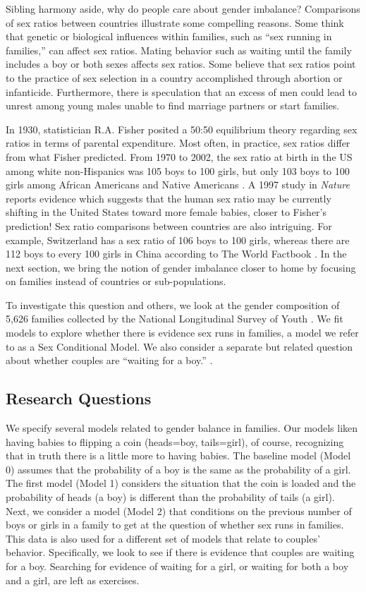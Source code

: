 \documentclass[
]{krantz}
\begin{document}
Sibling harmony aside, why do people care about gender imbalance? Comparisons of sex ratios between countries illustrate some compelling reasons. Some think that genetic or biological influences within families, such as ``sex running in families,'' can affect sex ratios. Mating behavior such as waiting until the family includes a boy or both sexes affects sex ratios. Some believe that sex ratios point to the practice of sex selection in a country accomplished through abortion or infanticide. Furthermore, there is speculation that an excess of men could lead to unrest among young males unable to find marriage partners or start families.

In 1930, statistician R.A. Fisher posited a 50:50 equilibrium theory regarding sex ratios in terms of parental expenditure. Most often, in practice, sex ratios differ from what Fisher predicted. From 1970 to 2002, the sex ratio at birth in the US among white non-Hispanics was 105 boys to 100 girls, but only 103 boys to 100 girls among African Americans and Native Americans \citep{Mathews2005}. A 1997 study in \emph{Nature} reports evidence which suggests that the human sex ratio may be currently shifting in the United States toward more female babies, closer to Fisher's prediction! \citep{Komdeur1997} Sex ratio comparisons between countries are also intriguing. For example, Switzerland has a sex ratio of 106 boys to 100 girls, whereas there are 112 boys to every 100 girls in China according to The World Factbook \citep{CIA2013}. In the next section, we bring the notion of gender imbalance closer to home by focusing on families instead of countries or sub-populations.

To investigate this question and others, we look at the gender composition of 5,626 families collected by the National Longitudinal Survey of Youth \citep{NLSY1997}. We fit models to explore whether there is evidence sex runs in families, a model we refer to as a Sex Conditional Model. We also consider a separate but related question about whether couples are ``waiting for a boy.'' \citep{Rodgers2001}.

\subsection{Research Questions}\label{research-questions}

We specify several models related to gender balance in families. Our models liken having babies to flipping a coin (heads=boy, tails=girl), of course, recognizing that in truth there is a little more to having babies. The baseline model (Model 0) assumes that the probability of a boy is the same as the probability of a girl. The first model (Model 1) considers the situation that the coin is loaded and the probability of heads (a boy) is different than the probability of tails (a girl). Next, we consider a model (Model 2) that conditions on the previous number of boys or girls in a family to get at the question of whether sex runs in families. This data is also used for a different set of models that relate to couples' behavior. Specifically, we look to see if there is evidence that couples are waiting for a boy. Searching for evidence of waiting for a girl, or waiting for both a boy and a girl, are left as exercises.
\end{document}
